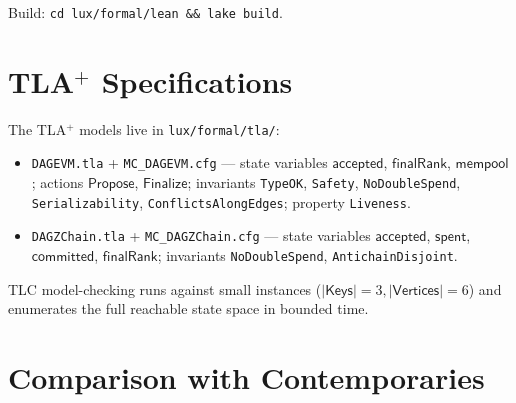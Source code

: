 \documentclass[11pt]{article}
\theoremstyle{definition}
\begin{document}
Build: \texttt{cd lux/formal/lean \&\& lake build}.

\section{TLA$^+$ Specifications}
\label{sec:tla}

The TLA$^+$ models live in \texttt{lux/formal/tla/}:

\begin{itemize}
  \item \texttt{DAGEVM.tla} + \texttt{MC\_DAGEVM.cfg} — state variables
    $\mathsf{accepted}$, $\mathsf{finalRank}$, $\mathsf{mempool}$;
    actions $\mathsf{Propose}$, $\mathsf{Finalize}$; invariants
    \texttt{TypeOK}, \texttt{Safety}, \texttt{NoDoubleSpend},
    \texttt{Serializability}, \texttt{ConflictsAlongEdges}; property
    \texttt{Liveness}.
  \item \texttt{DAGZChain.tla} + \texttt{MC\_DAGZChain.cfg} — state
    variables $\mathsf{accepted}$, $\mathsf{spent}$, $\mathsf{committed}$,
    $\mathsf{finalRank}$; invariants \texttt{NoDoubleSpend},
    \texttt{AntichainDisjoint}.
\end{itemize}

TLC model-checking runs against small instances
($|\mathsf{Keys}| = 3, |\mathsf{Vertices}| = 6$) and enumerates the full
reachable state space in bounded time.

\section{Comparison with Contemporaries}
\label{sec:contemporaries}
\end{document}
